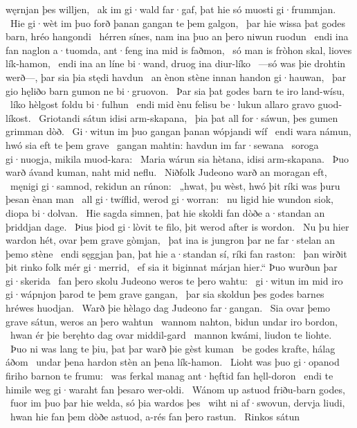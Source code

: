 węrnjan þes willjen, \hld\ ak im gi·wald far·gaf,
þat hie só muosti gi·frummjan. \hld\ Hie gi·wèt im þuo forð þanan
gangan te þem galgon, \hld\ þar hie wissa þat godes barn,
hréo hangondi \hld\ hérren sínes,
nam ina þuo an þero niwun ruodun \hld\ endi ina fan naglon a·tuomda,
ant·feng ina mid is faðmon, \hld\ só man is fròhon skal,
lioves lík-hamon, \hld\ endi ina an líne bi·wand,
druog ina diur-líko \hld\ —só was þie drohtin werð—,
þar sia þia stędi havdun \hld\ an ènon stène innan
handon gi·hauwan, \hld\ þar gio hęliðo barn
gumon ne bi·gruovon. \hld\ Þar sia þat godes barn
te iro land-wísu, \hld\ líko hèlgost
foldu bi·fulhun \hld\ endi mid ènu felisu be·lukun
allaro gravo guod-líkost. \hld\ Griotandi sátun
idisi arm-skapana, \hld\ þia þat all for·sáwun,
þes gumen grimman dòð. \hld\ Gi·witun im þuo gangan þanan
wópjandi wíf \hld\ endi wara námun,
hwó sia eft te þem grave \hld\ gangan mahtin:
havdun im far·sewana \hld\ soroga gi·nuogja,
mikila muod-kara: \hld\ Maria wárun sia hètana,
idisi arm-skapana. \hld\ Þuo warð ávand kuman,
naht mid neflu. \hld\ Niðfolk Judeono
warð an moragan eft, \hld\ męnigi gi·samnod,
rekidun an rúnon: \hld\ „hwat, þu wèst, hwó þit ríki was
þuru þesan ènan man \hld\ all gi·twíflid,
werod gi·worran: \hld\ nu ligid hie wundon siok,
diopa bi·dolvan. \hld\ Hie sagda simnen, þat hie skoldi fan dòðe a·standan
an þriddjan dage. \hld\ Þius þiod gi·lòvit te filo,
þit werod after is wordon. \hld\ Nu þu hier wardon hét,
ovar þem grave gòmjan, \hld\ þat ina is jungron þar
ne far·stelan an þemo stène \hld\ endi sęggjan þan, þat hie a·standan sí,
ríki fan raston: \hld\ þan wirðit þit rinko folk
mér gi·merrid, \hld\ ef sia it biginnat márjan hier.“
Þuo wurðun þar gi·skerida \hld\ fan þero skolu Judeono
weros te þero wahtu: \hld\ gi·witun im mid iro gi·wápnjon þarod
te þem grave gangan, \hld\ þar sia skoldun þes godes barnes
hréwes huodjan. \hld\ Warð þie hèlago dag
Judeono far·gangan. \hld\ Sia ovar þemo grave sátun,
weros an þero wahtun \hld\ wannom nahton,
bidun undar iro bordon, \hld\ hwan ér þie berẹhto dag
ovar middil-gard \hld\ mannon kwámi,
liudon te liohte. \hld\ Þuo ni was lang te þiu,
þat þar warð þie gèst kuman \hld\ be godes krafte,
hálag áðom \hld\ undar þena hardon stèn
an þena lík-hamon. \hld\ Lioht was þuo gi·opanod
firiho barnon te frumu: \hld\ was ferkal manag
ant·hęftid fan hęll-doron \hld\ endi te himile weg
gi·waraht fan þesaro wer-oldi. \hld\ Wánom up astuod
friðu-barn godes, \hld\ fuor im þuo þar hie welda,
só þia wardos þes \hld\ wiht ni af·swovun,
dervja liudi, \hld\ hwan hie fan þem dòðe astuod,
a-rés fan þero rastun. \hld\ Rinkos sátun

